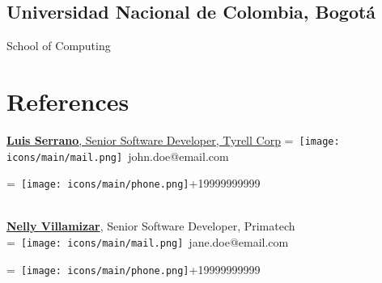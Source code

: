 \documentclass[]{plushcv}
\begin{document}
\begin{minipage}[t]{0.25\textwidth}
\sectionsep
\subsection{Universidad Nacional de Colombia, Bogotá}
School of Computing \\
\sectionsep


\section{References} 
\href{https://www.linkedin.com/company/john-doe/}{\textbf{Luis Serrano}, Senior Software Developer, Tyrell Corp}
\begingroup
{}=\hbox{
\texttt{[image: icons/main/mail.png]}\hspace{0.3cm} john.doe@email.com
}
\parbox{\wd0}{}
\endgroup
\begingroup
{}=\hbox{
\texttt{[image: icons/main/phone.png]}\hspace{0.3cm}+19999999999
}
\parbox{\wd0}{}\endgroup
\\

\sectionsep
\href{https://www.linkedin.com/company/john-doe/}{\textbf{Nelly Villamizar}}, Senior Software Developer, Primatech 
\\
\begingroup
{}=\hbox{
\texttt{[image: icons/main/mail.png]}\hspace{0.3cm} jane.doe@email.com
}
\parbox{\wd0}{}
\endgroup
\begingroup
{}=\hbox{
\texttt{[image: icons/main/phone.png]}\hspace{0.3cm}+19999999999
}
\parbox{\wd0}{}\endgroup
\\





\end{minipage}
\end{document}
